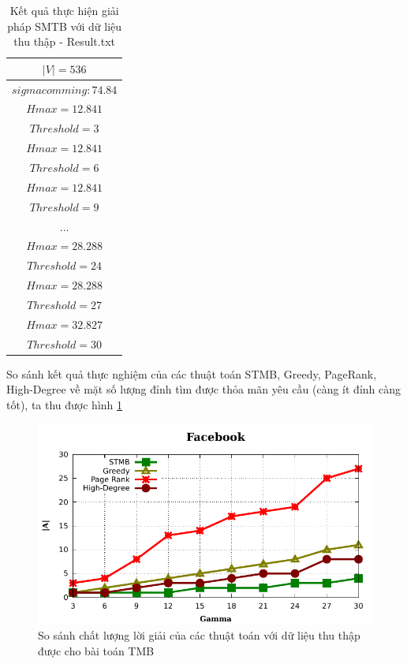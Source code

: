 \begin{itemize}
	\begin{table} [!htp]
		\centering
		\begin{tabular}{|c|}
			\hline
			$|V| = 536$\\
			\hline
			$sigma comming : 74.84$\\
			\hline
			$Hmax = 12.841$\\
			\hline
			$Threshold = 3$\\
			\hline
			$Hmax = 12.841$\\
			\hline
			$Threshold = 6$\\
			\hline
			$Hmax = 12.841$\\
			\hline
			$Threshold = 9$\\
			\hline
			...\\
			\hline
			$Hmax = 28.288$\\
			\hline
			$Threshold = 24$\\
			\hline
			$Hmax = 28.288$\\
			\hline
			$Threshold = 27$\\
			\hline
			$Hmax = 32.827$\\
			\hline
			$Threshold = 30$\\
			\hline 
		\end{tabular}
		\caption{Kết quả thực hiện giải pháp SMTB với dữ liệu thu thập - Result.txt}
		\label{bang4_7} 
	\end{table}
So sánh kết quả thực nghiệm của các thuật toán STMB, Greedy, PageRank, High-Degree về mặt số lượng đỉnh tìm được thỏa mãn yêu cầu (càng ít đỉnh càng tốt), ta thu được hình \ref{realData_TMB}
	\begin{center}
		\begin{figure}[H]
			\begin{center}
				\includegraphics [scale=1]{picture/Facebook}
			\end{center}
			\caption{So sánh chất lượng lời giải của các thuật toán với dữ liệu thu thập được cho bài toán TMB}
			\label{realData_TMB}
		\end{figure}
	\end{center}


\end{itemize}
